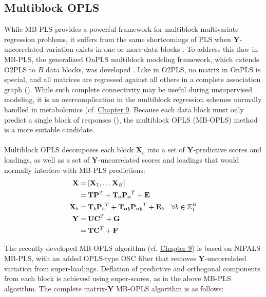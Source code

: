 \subsection{Multiblock OPLS}

\begin{doublespace}
While MB-PLS provides a powerful framework for multiblock multivariate
regression problems, it suffers from the same shortcomings of PLS when
$\mathbf{Y}$-uncorrelated variation exists in one or more data blocks
\cite{lofstedt:jchemo2011,lofstedt2012}. To address this flaw in MB-PLS,
the generalized OnPLS multiblock modeling framework, which extends O2PLS to
$B$ data blocks, was developed \cite{lofstedt2012}. Like in O2PLS, no matrix
in OnPLS is special, and all matrices are regressed against all others in a
complete association graph (). While such complete
connectivity may be useful during unsupervised modeling, it is an
overcomplication in the multiblock regression schemes normally handled in
metabolomics (cf. \hyperlink{chapter.9}{Chapter 9}. Because each data block
must only predict a single block of responses (),
the multiblock OPLS (MB-OPLS) method is a more suitable candidate.
\\\\
Multiblock OPLS decomposes each block $\mathbf{X}_b$ into a set of
$\mathbf{Y}$-predictive scores and loadings, as well as a set of
$\mathbf{Y}$-uncorrelated scores and loadings that would normally
interfere with MB-PLS predictions:
\begin{align}
\mathbf{X} =& \: [\mathbf{X}_1, \dots \mathbf{X}_B] \\
           =& \: \mathbf{T} \mathbf{P}^T +
                 \mathbf{T_o} \mathbf{P_o}^T + \mathbf{E} \\
\mathbf{X}_b =& \: \mathbf{T}_b {\mathbf{P}_b}^T +
                   \mathbf{T_o}_b {\mathbf{P_o}_b}^T + \mathbf{E}_b
 \quad \forall b \in \mathbb{Z}_{1}^{B} \\
\mathbf{Y} =& \: \mathbf{U} \mathbf{C}^T + \mathbf{G} \\
           =& \: \mathbf{T} \mathbf{C}^T + \mathbf{F} \nonumber
\end{align}

The recently developed MB-OPLS algorithm (cf. \hyperlink{chapter.9}{Chapter 9})
is based on NIPALS MB-PLS, with an added OPLS-type OSC filter that removes
$\mathbf{Y}$-uncorrelated variation from super-loadings. Deflation of
predictive and orthogonal components from each block is achieved using
super-scores, as in the above MB-PLS algorithm. The complete
matrix-$\mathbf{Y}$ MB-OPLS algorithm is as follows:
\end{doublespace}

